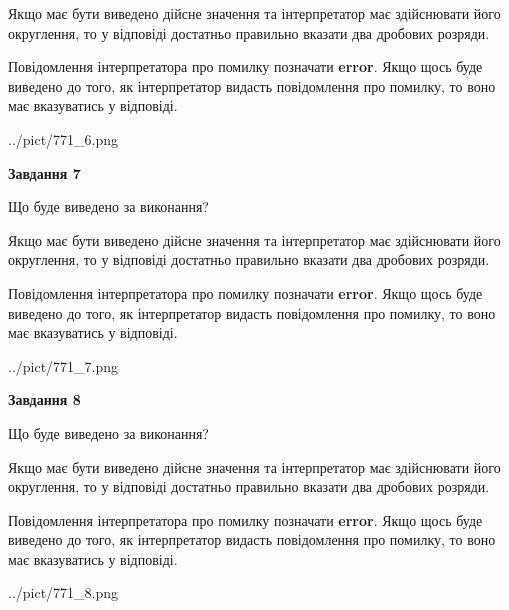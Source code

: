 \documentclass[12pt, ukrainian]{article}
\begin{document}
{\begin {Large}
Якщо має бути виведено дійсне значення та інтерпретатор має здійснювати його округлення, 
то у відповіді достатньо правильно вказати два дробових розряди.

Повідомлення інтерпретатора про помилку позначати \textbf{error}.
Якщо щось буде виведено до того, як інтерпретатор видасть повідомлення про помилку, 
то воно має вказуватись у відповіді. \par

\begin{center}
	{../pict/771_6.png}
\end{center}
\newpage

{\begin {center}\textbf{Завдання 7}\end {center}}\par
Що буде виведено за виконання? \par

Якщо має бути виведено дійсне значення та інтерпретатор має здійснювати його округлення, 
то у відповіді достатньо правильно вказати два дробових розряди.

Повідомлення інтерпретатора про помилку позначати \textbf{error}.
Якщо щось буде виведено до того, як інтерпретатор видасть повідомлення про помилку, 
то воно має вказуватись у відповіді. \par

\begin{center}
	{../pict/771_7.png}
\end{center}
\newpage

{\begin {center}\textbf{Завдання 8}\end {center}}\par
Що буде виведено за виконання? \par

Якщо має бути виведено дійсне значення та інтерпретатор має здійснювати його округлення, 
то у відповіді достатньо правильно вказати два дробових розряди.

Повідомлення інтерпретатора про помилку позначати \textbf{error}.
Якщо щось буде виведено до того, як інтерпретатор видасть повідомлення про помилку, 
то воно має вказуватись у відповіді. \par

\begin{center}
	{../pict/771_8.png}
\end{center}
\newpage


\end{Large}}
\end{document}

